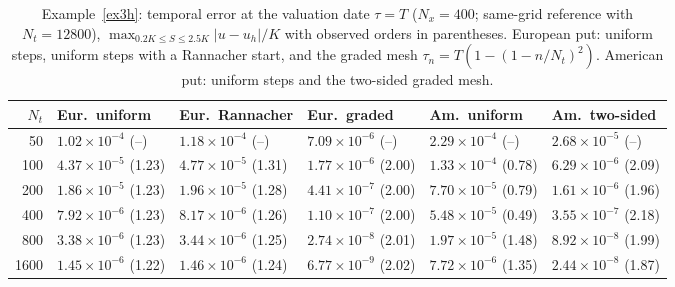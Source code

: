\begin{table}[htbp]
\centering
\scriptsize
\caption{Example~\ref{ex3h}: temporal error at the valuation date $\tau=T$ ($N_x=400$; same-grid reference with $N_t=12800$), $\max_{0.2K\le S\le2.5K}|u-u_h|/K$ with observed orders in parentheses. European put: uniform steps, uniform steps with a Rannacher start, and the graded mesh $\tau_n=T(1-(1-n/N_t)^2)$.  American put: uniform steps and the two-sided graded mesh.}
\label{tab:ex1_time}
\begin{tabular}{rlllll}
\toprule
$N_t$ & Eur.\ uniform & Eur.\ Rannacher & Eur.\ graded & Am.\ uniform & Am.\ two-sided \\
\midrule
50 & $1.02\times10^{-4}$ (--) & $1.18\times10^{-4}$ (--) & $7.09\times10^{-6}$ (--) & $2.29\times10^{-4}$ (--) & $2.68\times10^{-5}$ (--) \\
100 & $4.37\times10^{-5}$ (1.23) & $4.77\times10^{-5}$ (1.31) & $1.77\times10^{-6}$ (2.00) & $1.33\times10^{-4}$ (0.78) & $6.29\times10^{-6}$ (2.09) \\
200 & $1.86\times10^{-5}$ (1.23) & $1.96\times10^{-5}$ (1.28) & $4.41\times10^{-7}$ (2.00) & $7.70\times10^{-5}$ (0.79) & $1.61\times10^{-6}$ (1.96) \\
400 & $7.92\times10^{-6}$ (1.23) & $8.17\times10^{-6}$ (1.26) & $1.10\times10^{-7}$ (2.00) & $5.48\times10^{-5}$ (0.49) & $3.55\times10^{-7}$ (2.18) \\
800 & $3.38\times10^{-6}$ (1.23) & $3.44\times10^{-6}$ (1.25) & $2.74\times10^{-8}$ (2.01) & $1.97\times10^{-5}$ (1.48) & $8.92\times10^{-8}$ (1.99) \\
1600 & $1.45\times10^{-6}$ (1.22) & $1.46\times10^{-6}$ (1.24) & $6.77\times10^{-9}$ (2.02) & $7.72\times10^{-6}$ (1.35) & $2.44\times10^{-8}$ (1.87) \\
\bottomrule
\end{tabular}
\end{table}

